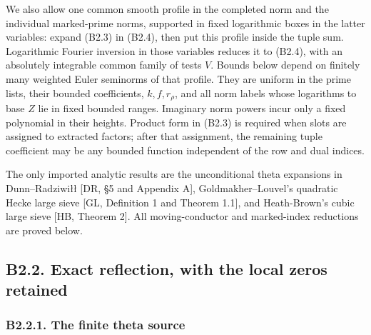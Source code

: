 \documentclass[11pt,a4paper]{article}
\begin{document}
We also allow one common smooth profile in the completed norm and the
individual marked-prime norms, supported in fixed logarithmic boxes in
the latter variables: expand (B2.3) in (B2.4), then put this profile
inside the tuple sum. Logarithmic Fourier inversion in those variables
reduces it to (B2.4), with an absolutely integrable common family of
tests \(V\). Bounds below depend on finitely many weighted Euler
seminorms of that profile. They are uniform in the prime lists, their
bounded coefficients, \(k,\allowbreak{}f,\allowbreak{}r_\rho\), and all norm labels whose
logarithms to base \(Z\) lie in fixed bounded ranges. Imaginary norm
powers incur only a fixed polynomial in their heights. Product form in
(B2.3) is required when slots are assigned to extracted factors; after
that assignment, the remaining tuple coefficient may be any bounded
function independent of the row and dual indices.

The only imported analytic results are the unconditional theta
expansions in Dunn--Radziwiłł {[}DR, §5 and Appendix A{]},
Goldmakher--Louvel's quadratic Hecke large sieve {[}GL, Definition 1 and
Theorem 1.1{]}, and Heath-Brown's cubic large sieve {[}HB, Theorem 2{]}.
All moving-conductor and marked-index reductions are proved below.

\hypertarget{b2.2.-exact-reflection-with-the-local-zeros-retained}{%
\subsection{B2.2. Exact reflection, with the local zeros
retained}\label{b2.2.-exact-reflection-with-the-local-zeros-retained}}

\hypertarget{b2.2.1.-the-finite-theta-source}{%
\subsubsection{B2.2.1. The finite theta
source}\label{b2.2.1.-the-finite-theta-source}}
\end{document}
